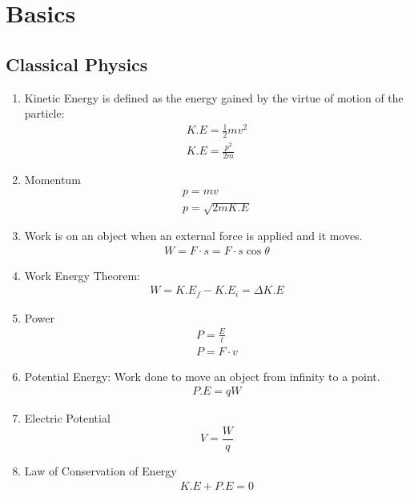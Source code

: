 \documentclass[12pt]{article}
\begin{document}
\clearpage
\tableofcontents
\clearpage

\section{Basics}

\subsection{Classical Physics}
\begin{enumerate}

	
	\item Kinetic Energy is defined as the energy gained by the virtue of motion of the particle: 
	\begin{eqnarray}
		K.E = \frac{1}{2}mv^2\\
		K.E = \frac{p^2}{2m}
	\end{eqnarray}

	\item Momentum
	\begin{eqnarray}
		p = mv\\
		p = \sqrt{2mK.E}
	\end{eqnarray}
	
	\item Work is on an object when an external force is applied and it moves. 
	\begin{eqnarray}
		W = F \cdot s = F\cdot s\cos\theta
	\end{eqnarray}
	
	\item Work Energy Theorem:
	\begin{eqnarray}
		W = K.E_f - K.E_i = \Delta K.E
	\end{eqnarray}

	\item Power
	\begin{eqnarray}
		P = \frac{E}{t}\\
		P = F\cdot v
	\end{eqnarray}

	\item Potential Energy: Work done to move an object from infinity to a point.
	\begin{eqnarray}
		P.E = qW
	\end{eqnarray}

	\item Electric Potential
	\begin{equation}
		V = \frac{W}{q}
	\end{equation}

	\item Law of Conservation of Energy
	\begin{eqnarray}
		K.E + P.E = 0
	\end{eqnarray}

\end{enumerate}
\end{document}

